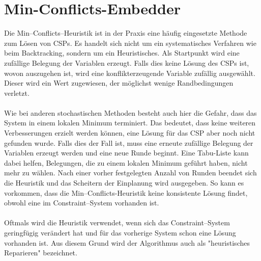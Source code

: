 \section{Min-Conflicts-Embedder}\label{minConflicts}
Die Min--Conflicts--Heuristik ist in der Praxis eine häufig eingesetzte Methode zum Lösen von CSPs. Es handelt sich nicht um ein systematisches Verfahren wie beim Backtracking, sondern um ein Heuristisches. Als Startpunkt wird eine zufällige Belegung der Variablen erzeugt. Falls dies keine Lösung des CSPs ist, wovon auszugehen ist, wird eine kon\-flikt\-er\-zeu\-gen\-de Variable zufällig ausgewählt. Dieser wird ein Wert zugewiesen, der möglichst wenige Randbedingungen verletzt.\\ \\
Wie bei anderen stochastischen Methoden besteht auch hier die Gefahr, dass das System in einem lokalen Minimum terminiert. Das bedeutet, dass keine weiteren Verbesserungen
erzielt werden können, eine Lösung für das CSP aber noch nicht gefunden
wurde. Falls dies der Fall ist, muss eine erneute zufällige Belegung der Variablen erzeugt werden und eine neue Runde beginnt. Eine Tabu-Liste kann dabei helfen, Belegungen, die zu einem lokalen Minimum geführt haben, nicht mehr zu wählen. Nach einer vorher festgelegten Anzahl von Runden beendet sich die Heuristik und das Scheitern der Einplanung wird ausgegeben. So kann es vorkommen, dass die Min--Conflicts-Heuristik keine konsistente Lösung findet, obwohl eine im Constraint--System vorhanden ist.\\ \\
Oftmals wird die Heuristik verwendet, wenn sich das Constraint--System geringfügig verändert hat und für das vorherige System schon eine Lösung vorhanden ist. Aus diesem Grund wird der Algorithmus auch als "heuristisches Reparieren" \cite{cspsolvingRepairMethod} bezeichnet.\\ \\
